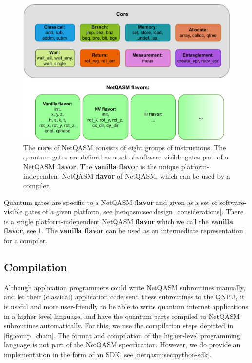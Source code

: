 \begin{figure}
      \centering
      \includegraphics[width=0.8\linewidth]{figures/netqasm/instructions.pdf}
      \caption{The \textbf{core} of \ac{NetQASM} consists of eight groups of
            instructions. The quantum gates are defined as a set of software-visible
            gates part of a \ac{NetQASM} \textbf{flavor}. The \textbf{vanilla flavor}
            is the unique platform-independent \ac{NetQASM} \textbf{flavor} of
            \ac{NetQASM}, which can be used by a compiler.}\label{fig:instructions}
\end{figure}

Quantum gates are specific to a \ac{NetQASM} \textbf{flavor} and given as a set of software-visible gates of a given platform, see \cref{netqasm:sec:design_considerations}.
There is a single platform-independent \ac{NetQASM} \textbf{flavor} which we call the \textbf{vanilla flavor}, see \cref{fig:instructions}.
The \textbf{vanilla flavor} can be used as an intermediate representation for a compiler.


\subsection{Compilation}
Although application programmers could write \ac{NetQASM} subroutines manually, and let their (classical) application code send these subroutines to the \ac{QNPU}, it is useful and more user-friendly to be able to write quantum internet applications in a higher level language, and have the quantum parts compiled to \ac{NetQASM} subroutines automatically.
For this, we use the compilation steps depicted in \cref{fig:comp_chain}.
The format and compilation of the higher-level programming language is not part of the \ac{NetQASM} specification.
However, we do provide an implementation in the form of an SDK, see \cref{netqasm:sec:python-sdk}.

